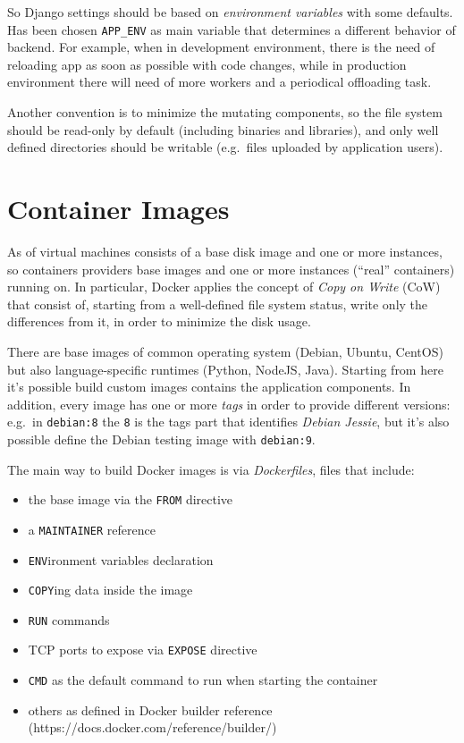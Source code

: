 So Django settings should be based on \emph{environment variables} with
some defaults. Has been chosen \texttt{APP\_ENV} as main variable that
determines a different behavior of backend. For example, when in
development environment, there is the need of reloading app as soon as
possible with code changes, while in production environment there will
need of more workers and a periodical offloading task.

Another convention is to minimize the mutating components, so the file
system should be read-only by default (including binaries and
libraries), and only well defined directories should be writable
(e.g.~files uploaded by application users).

\section{Container Images}\label{container-images}

As of virtual machines consists of a base disk image and one or more
instances, so containers providers base images and one or more instances
(``real'' containers) running on. In particular, Docker applies the
concept of \emph{Copy on Write} (CoW) that consist of, starting from a
well-defined file system status, write only the differences from it, in
order to minimize the disk usage.

There are base images of common operating system (Debian, Ubuntu,
CentOS) but also language-specific runtimes (Python, NodeJS, Java).
Starting from here it's possible build custom images contains the
application components. In addition, every image has one or more
\emph{tags} in order to provide different versions: e.g.~in
\texttt{debian:8} the \texttt{8} is the tags part that identifies
\emph{Debian Jessie}, but it's also possible define the Debian testing
image with \texttt{debian:9}.

The main way to build Docker images is via \emph{Dockerfiles}, files
that include:

\begin{itemize}
\itemsep1pt\parskip0pt
\item
  the base image via the \texttt{FROM} directive
\item
  a \texttt{MAINTAINER} reference
\item
  \texttt{ENV}ironment variables declaration
\item
  \texttt{COPY}ing data inside the image
\item
  \texttt{RUN} commands
\item
  TCP ports to expose via \texttt{EXPOSE} directive
\item
  \texttt{CMD} as the default command to run when starting the container
\item
  others as defined in Docker builder reference
  (https://docs.docker.com/reference/builder/)
\end{itemize}

